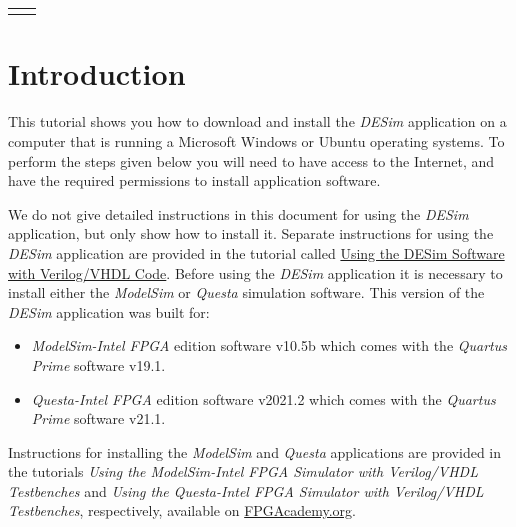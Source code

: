 \documentclass[11pt, twoside, pdftex]{article}
\newcommand{\doctitle}{DESim Installation Guide}
\begin{document}
\begin{table}
    \centering
    \begin{tabular}{p{5cm}p{4cm}}
        \hspace{-3cm}
        &
        \raisebox{1\height}{\parbox[h]{0.5\textwidth}{\Large{}\selectfont{\textsf{\doctitle}}}}
    \end{tabular}
    \label{tab:logo}
\end{table}

\colorbox[rgb]{0,0.384,0.816}{\parbox[h]{\textwidth}{\color{white}\textsf{\textit{\textBar}}}}

\thispagestyle{plain}

\newcommand{\green}[1]{{\color{AppleGreen}\sf{#1}}}
\newcommand{\red}[1]{{\color{red}\sf{#1}}}


\section{Introduction}

This tutorial shows you how to download and install the {\it DESim} application
on a computer that is running a Microsoft Windows or Ubuntu operating systems.  
To perform the steps given below you will need to have 
access to the Internet, and have the required permissions to install application software.

We do not give detailed instructions in this document for using the {\it DESim} application, 
but only show how to install it. Separate instructions for using the {\it DESim} application 
are provided in the tutorial called 
\href{https://github.com/fpgacademy/DESim/releases/download/v2.0/DESim\_tutorial.pdf}
{Using the DESim Software with Verilog/VHDL Code}.
Before using the {\it DESim} application it is necessary to install either the {\it ModelSim} 
or {\it Questa} simulation software. This version of the {\it DESim} application was built for:
\begin{itemize}
	\item {\it ModelSim-Intel FPGA} edition software v10.5b which comes with the 
{\it Quartus Prime} software v19.1. 
	\item {\it Questa-Intel FPGA} edition software v2021.2 which comes
		with the 
{\it Quartus Prime} software v21.1. 
\end{itemize}
Instructions for installing the {\it ModelSim} and {\it Questa} applications are
provided in the tutorials  {\it Using the ModelSim-Intel FPGA Simulator with Verilog/VHDL
Testbenches} and {\it Using the Questa-Intel FPGA Simulator with Verilog/VHDL Testbenches}, 
respectively, available on \href{https://www.fpgacademy.org/tutorials.html}{FPGAcademy.org}. 
\end{document}
